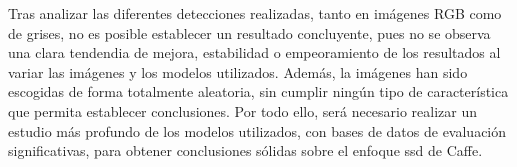 Tras analizar las diferentes detecciones realizadas, tanto en imágenes RGB como de grises, no es posible establecer un resultado concluyente, pues no se observa una clara tendendia de mejora, estabilidad o empeoramiento de los resultados al variar las imágenes y los modelos utilizados. Además, la imágenes han sido escogidas de forma totalmente aleatoria, sin cumplir ningún tipo de característica que permita establecer conclusiones. Por todo ello, será necesario realizar un estudio más profundo de los modelos utilizados, con bases de datos de evaluación significativas, para obtener conclusiones sólidas sobre el enfoque \acrshort{ssd} de Caffe. \\

